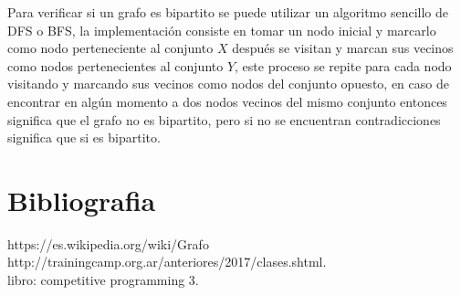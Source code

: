 \documentclass[12pt, a4paper]{article}
\newcommand\cppfile[2][]{

}
\begin{document}
	Para verificar si un grafo es bipartito se puede utilizar un algoritmo sencillo de DFS o BFS, la implementación
	consiste en tomar un nodo inicial y marcarlo como nodo perteneciente al conjunto $X$ después se visitan y marcan 
	sus vecinos como nodos pertenecientes al conjunto $Y$, este proceso se repite para cada nodo visitando y marcando 
	sus vecinos como nodos del conjunto opuesto, en caso de encontrar en algún momento a dos nodos vecinos del mismo
	conjunto entonces significa que el grafo no es bipartito, pero si no se encuentran contradicciones significa que 
	si es bipartito.
	\cppfile[14-42]{Grafos/codigos/BipartiteCheck.cpp}	
	
	\section{Bibliografia}
	https://es.wikipedia.org/wiki/Grafo\\
	http://trainingcamp.org.ar/anteriores/2017/clases.shtml.\\ 
	libro: competitive programming 3.\\ 



	
	
	
\end{document}
